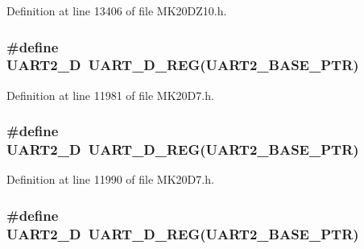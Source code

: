 Definition at line 13406 of file M\+K20\+D\+Z10.\+h.

\subsubsection[{\texorpdfstring{U\+A\+R\+T2\+\_\+D}{UART2_D}}]{\setlength{\rightskip}{0pt plus 5cm}\#define U\+A\+R\+T2\+\_\+D~{\bf U\+A\+R\+T\+\_\+\+D\+\_\+\+R\+EG}({\bf U\+A\+R\+T2\+\_\+\+B\+A\+S\+E\+\_\+\+P\+TR})}\hypertarget{group___u_a_r_t___register___accessor___macros_ga92cfdefa4bbd5e6aceaad280e911b76b}{}\label{group___u_a_r_t___register___accessor___macros_ga92cfdefa4bbd5e6aceaad280e911b76b}


Definition at line 11981 of file M\+K20\+D7.\+h.

\subsubsection[{\texorpdfstring{U\+A\+R\+T2\+\_\+D}{UART2_D}}]{\setlength{\rightskip}{0pt plus 5cm}\#define U\+A\+R\+T2\+\_\+D~{\bf U\+A\+R\+T\+\_\+\+D\+\_\+\+R\+EG}({\bf U\+A\+R\+T2\+\_\+\+B\+A\+S\+E\+\_\+\+P\+TR})}\hypertarget{group___u_a_r_t___register___accessor___macros_ga92cfdefa4bbd5e6aceaad280e911b76b}{}\label{group___u_a_r_t___register___accessor___macros_ga92cfdefa4bbd5e6aceaad280e911b76b}


Definition at line 11990 of file M\+K20\+D7.\+h.

\subsubsection[{\texorpdfstring{U\+A\+R\+T2\+\_\+D}{UART2_D}}]{\setlength{\rightskip}{0pt plus 5cm}\#define U\+A\+R\+T2\+\_\+D~{\bf U\+A\+R\+T\+\_\+\+D\+\_\+\+R\+EG}({\bf U\+A\+R\+T2\+\_\+\+B\+A\+S\+E\+\_\+\+P\+TR})}\hypertarget{group___u_a_r_t___register___accessor___macros_ga92cfdefa4bbd5e6aceaad280e911b76b}{}\label{group___u_a_r_t___register___accessor___macros_ga92cfdefa4bbd5e6aceaad280e911b76b}


